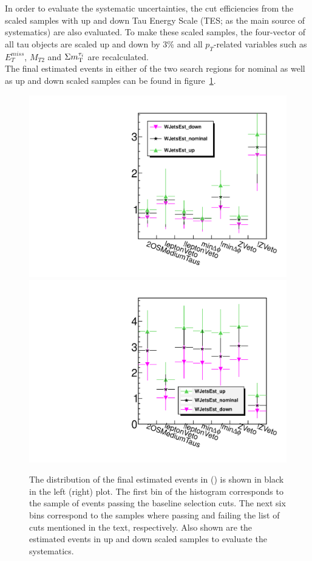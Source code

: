 In order to evaluate the systematic uncertainties, the cut efficiencies from the scaled samples with 
up and down Tau Energy Scale (TES; as the main source of systematics) are also evaluated.
To make these scaled samples, the four-vector of all tau objects 
are scaled up and down by 3\% and all $p_T$-related variables such as $E_T^{miss}$, $M_{T2}$ and $\Sigma m_{\rm T}^{\tau_i}$ are recalculated.\\
The final estimated \wjets events in either of the two search regions for nominal as well as up and down scaled samples 
can be found in figure~\ref{fig:wjets_1}.  
\begin{figure}[!Hhtb]
\centering
\includegraphics[angle=0,scale=0.35]{TauTauFigs/WJets_bin1.pdf}
\includegraphics[angle=0,scale=0.35]{TauTauFigs/WJets_binII.pdf}\\
\caption{The distribution of the final estimated \wjets events in \binone (\bintwo) is shown in black in the left (right) plot. 
 The first bin of the histogram corresponds to the sample of events passing the baseline selection cuts. 
The next six bins correspond to the samples where passing and failing the 
list of cuts mentioned in the text, respectively. Also shown are the estimated \wjets events in up and down scaled samples to evaluate the systematics.}
\label{fig:wjets_1}
\end{figure}
